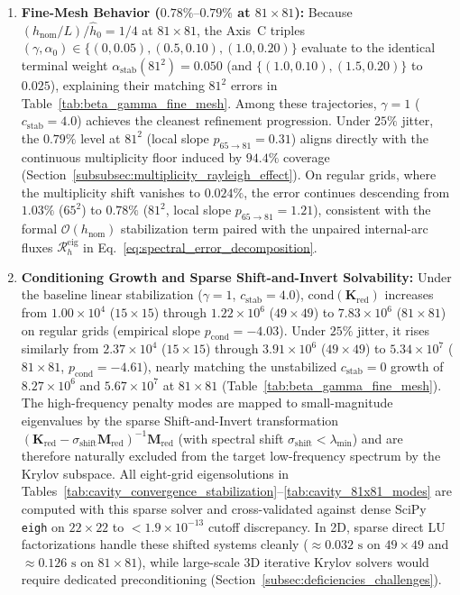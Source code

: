 \documentclass[VANCOUVER]{USG}
\begin{document}
\begin{enumerate}
    \item \textbf{Fine-Mesh Behavior ($0.78\%\text{--}0.79\%$ at $81\times 81$):} Because $(h_{\mathrm{nom}}/L)/\hat{h}_0 = 1/4$ at $81\times 81$, the Axis~C triples $(\gamma, \alpha_0) \in \{(0, 0.05), (0.5, 0.10), (1.0, 0.20)\}$ evaluate to the identical terminal weight $\alpha_{\mathrm{stab}}(81^2) = 0.050$ (and $\{(1.0, 0.10), (1.5, 0.20)\}$ to $0.025$), explaining their matching $81^2$ errors in Table~\ref{tab:beta_gamma_fine_mesh}. Among these trajectories, $\gamma = 1$ ($c_{\mathrm{stab}} = 4.0$) achieves the cleanest refinement progression. Under $25\%$ jitter, the $0.79\%$ level at $81^2$ (local slope $p_{65\to 81} = 0.31$) aligns directly with the continuous multiplicity floor induced by $94.4\%$ coverage (Section~\ref{subsubsec:multiplicity_rayleigh_effect}). On regular grids, where the multiplicity shift vanishes to $0.024\%$, the error continues descending from $1.03\%$ ($65^2$) to $0.78\%$ ($81^2$, local slope $p_{65\to 81} = 1.21$), consistent with the formal $\mathcal{O}(h_{\mathrm{nom}})$ stabilization term paired with the unpaired internal-arc fluxes $\mathcal{R}_h^{\mathrm{eig}}$ in Eq.~\eqref{eq:spectral_error_decomposition}.
    \item \textbf{Conditioning Growth and Sparse Shift-and-Invert Solvability:} Under the baseline linear stabilization ($\gamma = 1$, $c_{\mathrm{stab}} = 4.0$), $\mathrm{cond}(\mathbf{K}_{\mathrm{red}})$ increases from $1.00 \times 10^4$ ($15\times 15$) through $1.22 \times 10^6$ ($49\times 49$) to $7.83 \times 10^6$ ($81\times 81$) on regular grids (empirical slope $p_{\mathrm{cond}} = -4.03$). Under $25\%$ jitter, it rises similarly from $2.37 \times 10^4$ ($15\times 15$) through $3.91 \times 10^6$ ($49\times 49$) to $5.34 \times 10^7$ ($81\times 81$, $p_{\mathrm{cond}} = -4.61$), nearly matching the unstabilized $c_{\mathrm{stab}} = 0$ growth of $8.27 \times 10^6$ and $5.67 \times 10^7$ at $81 \times 81$ (Table~\ref{tab:beta_gamma_fine_mesh}). The high-frequency penalty modes are mapped to small-magnitude eigenvalues by the sparse Shift-and-Invert transformation $(\mathbf{K}_{\mathrm{red}} - \sigma_{\mathrm{shift}} \mathbf{M}_{\mathrm{red}})^{-1}\mathbf{M}_{\mathrm{red}}$ (with spectral shift $\sigma_{\mathrm{shift}} < \lambda_{\min}$) \cite{saad2011numerical, lehoucq1998arpack} and are therefore naturally excluded from the target low-frequency spectrum by the Krylov subspace. All eight-grid eigensolutions in Tables~\ref{tab:cavity_convergence_stabilization}--\ref{tab:cavity_81x81_modes} are computed with this sparse solver and cross-validated against dense SciPy \texttt{eigh} \cite{virtanen2020scipy} on $22\times 22$ to $< 1.9 \times 10^{-13}$ cutoff discrepancy. In 2D, sparse direct LU factorizations handle these shifted systems cleanly ($\approx 0.032\text{ s}$ on $49\times 49$ and $\approx 0.126\text{ s}$ on $81\times 81$), while large-scale 3D iterative Krylov solvers would require dedicated preconditioning (Section~\ref{subsec:deficiencies_challenges}).
\end{enumerate}
\end{document}
